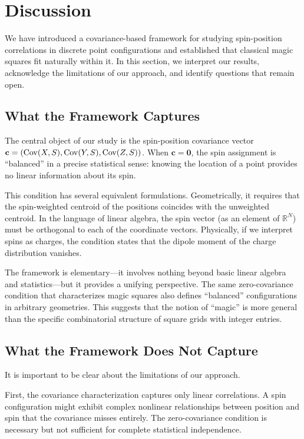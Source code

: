 \section{Discussion}
\label{sec:discussion}

We have introduced a covariance-based framework for studying spin-position correlations in discrete point configurations and established that classical magic squares fit naturally within it. In this section, we interpret our results, acknowledge the limitations of our approach, and identify questions that remain open.

\subsection{What the Framework Captures}

The central object of our study is the spin-position covariance vector $\mathbf{c} = (\operatorname{Cov}(X,S), \operatorname{Cov}(Y,S), \operatorname{Cov}(Z,S))$. When $\mathbf{c} = \mathbf{0}$, the spin assignment is ``balanced'' in a precise statistical sense: knowing the location of a point provides no linear information about its spin.

This condition has several equivalent formulations. Geometrically, it requires that the spin-weighted centroid of the positions coincides with the unweighted centroid. In the language of linear algebra, the spin vector (as an element of $\mathbb{R}^N$) must be orthogonal to each of the coordinate vectors. Physically, if we interpret spins as charges, the condition states that the dipole moment of the charge distribution vanishes.

The framework is elementary---it involves nothing beyond basic linear algebra and statistics---but it provides a unifying perspective. The same zero-covariance condition that characterizes magic squares also defines ``balanced'' configurations in arbitrary geometries. This suggests that the notion of ``magic'' is more general than the specific combinatorial structure of square grids with integer entries.

\subsection{What the Framework Does Not Capture}

It is important to be clear about the limitations of our approach.

First, the covariance characterization captures only linear correlations. A spin configuration might exhibit complex nonlinear relationships between position and spin that the covariance misses entirely. The zero-covariance condition is necessary but not sufficient for complete statistical independence.

